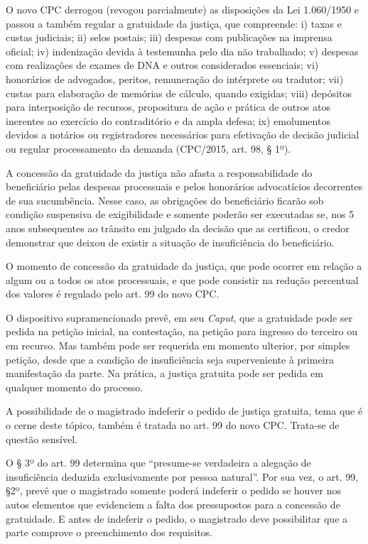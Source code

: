 \documentclass[]{report}
\begin{document}
O novo CPC derrogou (revogou parcialmente) as disposições da Lei
1.060/1950 e passou a também regular a gratuidade da justiça, que
compreende: i) taxas e custas judiciais; ii) selos postais; iii)
despesas com publicações na imprensa oficial; iv) indenização devida à
testemunha pelo dia não trabalhado; v) despesas com realizações de
exames de DNA e outros considerados essenciais; vi) honorários de
advogados, peritos, remuneração do intérprete ou tradutor; vii) custas
para elaboração de memórias de cálculo, quando exigidas; viii) depósitos
para interposição de recursos, propositura de ação e prática de outros
atos inerentes ao exercício do contraditório e da ampla defesa; ix)
emolumentos devidos a notários ou registradores necessários para
efetivação de decisão judicial ou regular processamento da demanda
(CPC/2015, art. 98, § 1º).

A concessão da gratuidade da justiça não afasta a responsabilidade do
beneficiário pelas despesas processuais e pelos honorários advocatícios
decorrentes de sua sucumbência. Nesse caso, as obrigações do
beneficiário ficarão sob condição suspensiva de exigibilidade e somente
poderão ser executadas se, nos 5 anos subsequentes ao trânsito em
julgado da decisão que as certificou, o credor demonstrar que deixou de
existir a situação de insuficiência do beneficiário.

O momento de concessão da gratuidade da justiça, que pode ocorrer em
relação a algum ou a todos os atos processuais, e que pode consistir na
redução percentual dos valores é regulado pelo art. 99 do novo CPC.

O dispositivo supramencionado prevê, em seu \emph{Caput}, que a
gratuidade pode ser pedida na petição inicial, na contestação, na
petição para ingresso do terceiro ou em recurso. Mas também pode ser
requerida em momento ulterior, por simples petição, desde que a condição
de insuficiência seja superveniente à primeira manifestação da parte. Na
prática, a justiça gratuita pode ser pedida em qualquer momento do
processo.

A possibilidade de o magistrado indeferir o pedido de justiça gratuita,
tema que é o cerne deste tópico, também é tratada no art. 99 do novo
CPC. Trata-se de questão sensível.

O § 3º do art. 99 determina que ``presume-se verdadeira a alegação de
insuficiência deduzida exclusivamente por pessoa natural''. Por sua vez,
o art. 99, §2º, prevê que o magistrado somente poderá indeferir o pedido
se houver nos autos elementos que evidenciem a falta dos pressupostos
para a concessão de gratuidade. E antes de indeferir o pedido, o
magistrado deve possibilitar que a parte comprove o preenchimento dos
requisitos.
\end{document}
